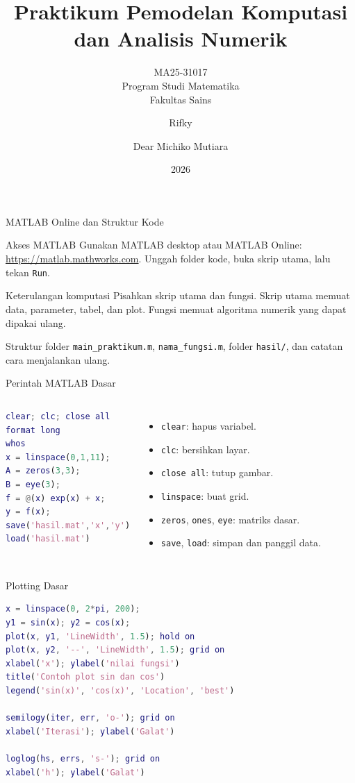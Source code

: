\documentclass[slides,english,noindex,lean,nobackpage,nocopyright,noupdate,nosummary]{enacom}
\title{Praktikum Pemodelan Komputasi dan Analisis Numerik}
\subtitle{MA25-31017\\Program Studi Matematika\\Fakultas Sains}
\author{Rifky}{Fauzi}
\author{Dear Michiko Mutiara}{Noor}
\date{2026}
\begin{document}
\begin{frame}{MATLAB Online dan Struktur Kode}
\begin{block}{Akses MATLAB}
Gunakan MATLAB desktop atau MATLAB Online: \url{https://matlab.mathworks.com}. Unggah folder kode, buka skrip utama, lalu tekan \texttt{Run}.
\end{block}
\begin{block}{Keterulangan komputasi}
Pisahkan skrip utama dan fungsi. Skrip utama memuat data, parameter, tabel, dan plot. Fungsi memuat algoritma numerik yang dapat dipakai ulang.
\end{block}
\begin{exampleblock}{Struktur folder}
\texttt{main\_praktikum.m}, \texttt{nama\_fungsi.m}, folder \texttt{hasil/}, dan catatan cara menjalankan ulang.
\end{exampleblock}
\end{frame}

\begin{frame}{Perintah MATLAB Dasar}
\begin{columns}[T]
\begin{lstlisting}[language=Matlab]
clear; clc; close all
format long
whos
x = linspace(0,1,11);
A = zeros(3,3);
B = eye(3);
f = @(x) exp(x) + x;
y = f(x);
save('hasil.mat','x','y')
load('hasil.mat')
\end{lstlisting}
\begin{itemize}
\item \texttt{clear}: hapus variabel.
\item \texttt{clc}: bersihkan layar.
\item \texttt{close all}: tutup gambar.
\item \texttt{linspace}: buat grid.
\item \texttt{zeros}, \texttt{ones}, \texttt{eye}: matriks dasar.
\item \texttt{save}, \texttt{load}: simpan dan panggil data.
\end{itemize}
\end{columns}
\end{frame}

\begin{frame}{Plotting Dasar}
\begin{lstlisting}[language=Matlab]
x = linspace(0, 2*pi, 200);
y1 = sin(x); y2 = cos(x);
plot(x, y1, 'LineWidth', 1.5); hold on
plot(x, y2, '--', 'LineWidth', 1.5); grid on
xlabel('x'); ylabel('nilai fungsi')
title('Contoh plot sin dan cos')
legend('sin(x)', 'cos(x)', 'Location', 'best')

semilogy(iter, err, 'o-'); grid on
xlabel('Iterasi'); ylabel('Galat')

loglog(hs, errs, 's-'); grid on
xlabel('h'); ylabel('Galat')
\end{lstlisting}
\end{frame}
\end{document}
